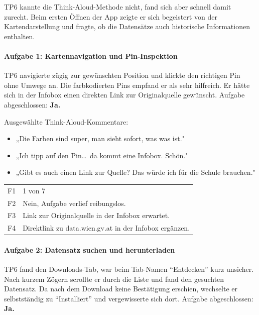 \documentclass{article}
\begin{document}
TP6 kannte die Think-Aloud-Methode nicht, fand sich aber schnell
damit zurecht. Beim ersten Öffnen der App zeigte er sich begeistert
von der Kartendarstellung und fragte, ob die Datensätze auch
historische Informationen enthalten.

\paragraph{Aufgabe 1: Kartennavigation und Pin-Inspektion}

TP6 navigierte zügig zur gewünschten Position und klickte den richtigen
Pin ohne Umwege an. Die farbkodierten Pins empfand er als sehr hilfreich.
Er hätte sich in der Infobox einen direkten Link zur Originalquelle
gewünscht.
Aufgabe abgeschlossen: \textbf{Ja.}

Ausgewählte Think-Aloud-Kommentare:
\begin{itemize}
  \item „Die Farben sind super, man sieht sofort, was was ist."
  \item „Ich tipp auf den Pin\ldots\ da kommt eine Infobox. Schön."
  \item „Gibt es auch einen Link zur Quelle? Das würde ich für die
        Schule brauchen."
\end{itemize}

\begin{tabular}{@{}lp{10cm}@{}}
  F1 & 1 von 7 \\
  F2 & Nein, Aufgabe verlief reibungslos. \\
  F3 & Link zur Originalquelle in der Infobox erwartet. \\
  F4 & Direktlink zu data.wien.gv.at in der Infobox ergänzen. \\
\end{tabular}

\paragraph{Aufgabe 2: Datensatz suchen und herunterladen}

TP6 fand den Downloads-Tab, war beim Tab-Namen \enquote{Entdecken}
kurz unsicher. Nach kurzem Zögern scrollte er durch die Liste und
fand den gesuchten Datensatz. Da nach dem Download keine
Bestätigung erschien, wechselte er selbstständig zu
\enquote{Installiert} und vergewisserte sich dort.
Aufgabe abgeschlossen: \textbf{Ja.}
\end{document}
